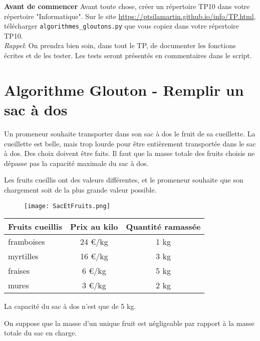 
\textbf{Avant de commencer}
Avant toute chose, créer un répertoire TP10 dans votre répertoire "Informatique". Sur le site \url{https://ptsilamartin.github.io/info/TP.html}, télécharger \lstinline{algorithmes_gloutons.py} que vous copiez dans votre répertoire TP10.\\

\emph{Rappel}: On prendra bien soin, dans tout le TP, de documenter les fonctions écrites et de les tester. Les tests seront présentés en commentaires dans le script.

\section*{Algorithme Glouton - Remplir un sac à dos}

Un promeneur souhaite transporter dans son sac à dos le fruit de sa cueillette. La cueillette est belle, mais trop lourde pour être entièrement transportée dans le sac à dos. Des choix doivent être faits. Il faut que la masse totale des fruits choisis ne dépasse pas la capacité maximale du sac à dos.

Les fruits cueillis ont des valeurs différentes, et le promeneur souhaite que son chargement soit de la plus grande valeur possible.

\begin{figure}[h]
	\centering
		\texttt{[image: SacEtFruits.png]}
	\label{fig:SacEtFruits}
\end{figure}



\begin{table}[h]
	\centering
		\begin{tabular}{|l|c|c|}
\hline
Fruits cueillis	& Prix au kilo & Quantité ramassée\\
\hline
framboises& 24 €/kg  & 1 kg \\
myrtilles & 16 €/kg & 3 kg  \\
fraises & 6 €/kg & 5 kg \\
mures & 3 €/kg & 2 kg \\
\hline
		\end{tabular}
	\label{tab_fruit}
\end{table}

La capacité du sac à dos n’est que de 5 kg.

On suppose que la masse d’un unique fruit est négligeable par rapport à la masse totale du sac en charge.

